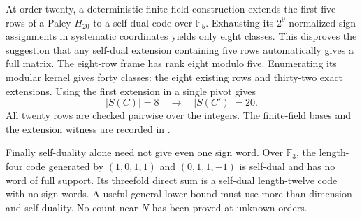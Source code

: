 At order twenty, a deterministic finite-field construction extends
the first five rows of a Paley $H_{20}$ to a self-dual code over
$\mathbb F_5$. Exhausting its $2^9$ normalized sign assignments in
systematic coordinates yields only eight classes. This disproves
the suggestion that any self-dual extension containing five rows
automatically gives a full matrix. The eight-row frame has rank
eight modulo five. Enumerating its modular kernel gives forty
classes: the eight existing rows and thirty-two exact extensions.
Using the first extension in a single pivot gives
\[
             |S(C)|=8\quad\longrightarrow\quad |S(C')|=20.
\]
All twenty rows are checked pairwise over the integers.
The finite-field bases and the extension witness are recorded in
.

Finally self-duality alone need not give even one sign word.
Over $\mathbb F_3$, the length-four code generated by
$(1,0,1,1)$ and $(0,1,1,-1)$ is self-dual and has no word of full
support. Its threefold direct sum is a self-dual length-twelve code
with no sign words. A useful general lower bound must use more than
dimension and self-duality. No count near $N$ has been proved at
unknown orders.
